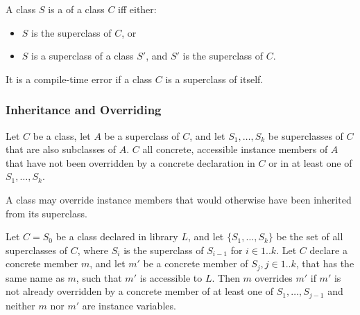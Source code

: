 \documentclass[makeidx]{article}
\begin{document}
\LMHash{}%
A class $S$ is a  of a class $C$ if{}f either:

\begin{itemize}
\item $S$ is the superclass of $C$, or
\item $S$ is a superclass of a class $S'$,
  and $S'$ is the superclass of $C$.
\end{itemize}

\LMHash{}%
It is a compile-time error if a class $C$ is a superclass of itself.


\subsubsection{Inheritance and Overriding}

\LMHash{}%
Let $C$ be a class, let $A$ be a superclass of $C$, and
let $S_1, \ldots, S_k$ be superclasses of $C$ that are also subclasses of $A$.
$C$  all concrete, accessible instance members of $A$
that have not been overridden by a concrete declaration in $C$
or in at least one of $S_1, \ldots, S_k$.


\LMHash{}%
A class may override instance members
that would otherwise have been inherited from its superclass.

\LMHash{}%
Let $C = S_0$ be a class declared in library $L$, and
let $\{S_1, \ldots, S_k\}$ be the set of all superclasses of $C$,
where $S_i$ is the superclass of $S_{i-1}$ for $i \in 1 .. k$.
Let $C$ declare a concrete member $m$, and
let $m'$ be a concrete member of $S_j, j \in 1 .. k$, that has
the same name as $m$,
such that $m'$ is accessible to $L$.
Then $m$ overrides $m'$
if $m'$ is not already overridden by a concrete member of
at least one of $S_1, \ldots, S_{j-1}$
and neither $m$ nor $m'$ are instance variables.
\end{document}
